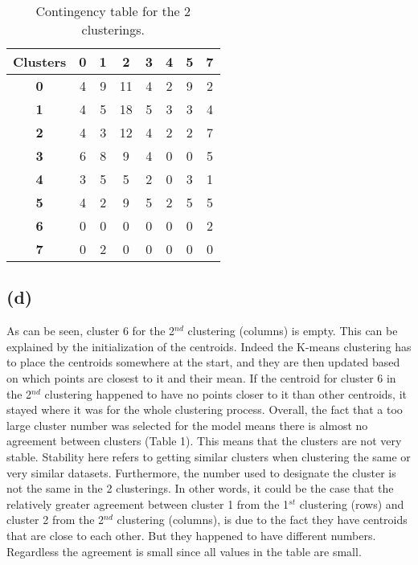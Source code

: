 \documentclass[12pt]{report} %
\begin{document}
\begin{table}[h]
\centering
\begin{tabular}{ |c|c|c|c|c|c|c|c| }
    \hline
    \textbf{Clusters} & \textbf{0} & \textbf{1} & \textbf{2} & \textbf{3} & \textbf{4} & \textbf{5} & \textbf{7} \\ 
    \hline
    \textbf{0} & 4 & 9 & 11 & 4 & 2 & 9 & 2 \\
    \hline
    \textbf{1} & 4 & 5 & 18 & 5 & 3 & 3 & 4 \\
    \hline
    \textbf{2} & 4 & 3 & 12 & 4 & 2 & 2 & 7 \\
    \hline
    \textbf{3} & 6 & 8 & 9 & 4 & 0 & 0 & 5 \\
    \hline
    \textbf{4} & 3 & 5 & 5 & 2 & 0 & 3 & 1 \\
    \hline
    \textbf{5} & 4 & 2 & 9 & 5 & 2 & 5 & 5 \\
    \hline
    \textbf{6} & 0 & 0 & 0 & 0 & 0 & 0 & 2 \\
    \hline
    \textbf{7} & 0 & 2 & 0 & 0 & 0 & 0 & 0 \\
    \hline

\end{tabular}
\caption{Contingency table for the 2 clusterings.}
\end{table}

\subsection*{(d)}

As can be seen, cluster 6 for the 2$^{nd}$ clustering (columns) is empty. This can be explained by the initialization of the centroids. Indeed the K-means clustering has to place the centroids somewhere at the start, and they are then updated based on which points are closest to it and their mean. If the centroid for cluster 6 in the 2$^{nd}$ clustering happened to have no points closer to it than other centroids, it stayed where it was for the whole clustering process\cite{scikit-learn}. Overall, the fact that a too large cluster number was selected for the model means there is almost no agreement between clusters (Table 1).  This means that the clusters are not very stable. Stability here refers to getting similar clusters when clustering the same or very similar datasets. Furthermore, the number used to designate the cluster is not the same in the 2 clusterings. In other words, it could be the case that the relatively greater agreement between cluster 1 from the 1$^{st}$ clustering (rows) and cluster 2 from the 2$^{nd}$ clustering (columns), is due to the fact they have centroids that are close to each other. But they happened to have different numbers. Regardless the agreement is small since all values in the table are small.  
\end{document}
